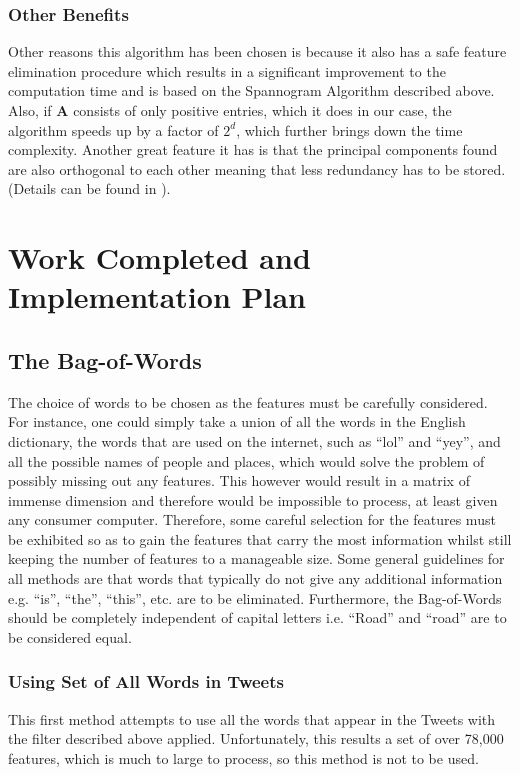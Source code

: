 \documentclass[11pt,a4paper]{article}
\begin{document}
\subsubsection{Other Benefits}
Other reasons this algorithm has been chosen is because it also has a safe feature elimination procedure which results in a significant improvement to the computation time and is based on the Spannogram Algorithm described above. Also, if $\mathbf{A}$ consists of only positive entries, which it does in our case, the algorithm speeds up by a factor of $2^d$, which further brings down the time complexity. Another great feature it has is that the principal components found are also orthogonal to each other meaning that less redundancy has to be stored. (Details can be found in \cite{dimakis}).
\clearpage
\section{Work Completed and Implementation Plan}

\subsection{The Bag-of-Words}
The choice of words to be chosen as the features must be carefully considered. For instance, one could simply take a union of all the words in the English dictionary, the words that are used on the internet, such as ``lol'' and ``yey'', and all the possible names of people and places, which would solve the problem of possibly missing out any features. This however would result in a matrix of immense dimension and therefore would be impossible to process, at least given any consumer computer. Therefore, some careful selection for the features must be exhibited so as to gain the features that carry the most information whilst still keeping the number of features to a manageable size. Some general guidelines for all methods are that words that typically do not give any additional information e.g. ``is'', ``the'', ``this'', etc. are to be eliminated. Furthermore, the Bag-of-Words should be completely independent of capital letters i.e. ``Road'' and ``road'' are to be considered equal. 

\subsubsection{Using Set of All Words in Tweets}
This first method attempts to use all the words that appear in the Tweets with the filter described above applied. Unfortunately, this results a set of over 78,000 features, which is much to large to process, so this method is not to be used. 
\end{document}

